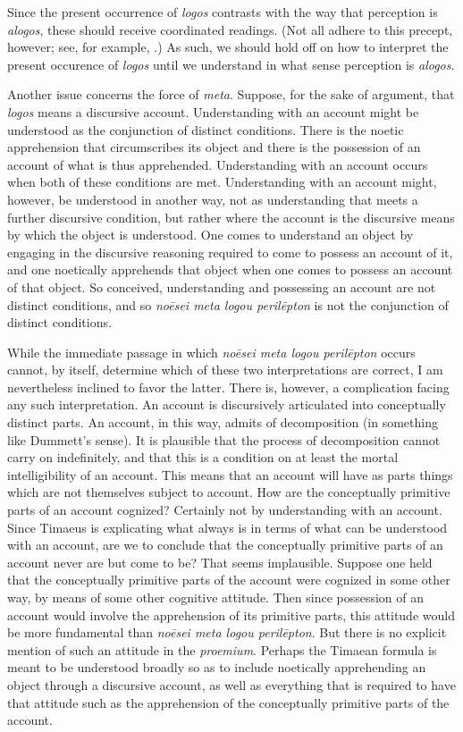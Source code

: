 Since the present occurrence of \emph{logos} contrasts with the way that perception is \emph{alogos}, these should receive coordinated readings. (Not all adhere to this precept, however; see, for example, \citealt[13]{Zeyl:2000cs}.) As such, we should hold off on how to interpret the present occurence of \emph{logos} until we understand in what sense perception is \emph{alogos}.

Another issue concerns the force of \emph{meta}. Suppose, for the sake of argument, that \emph{logos} means a discursive account. Understanding with an account might be understood as the conjunction of distinct conditions. There is the noetic apprehension that circumscribes its object and there is the possession of an account of what is thus apprehended. Understanding with an account occurs when both of these conditions are met. Understanding with an account might, however, be understood in another way, not as understanding that meets a further discursive condition, but rather where the account is the discursive means by which the object is understood. One comes to understand an object by engaging in the discursive reasoning required to come to possess an account of it, and one noetically apprehends that object when one comes to possess an account of that object. So conceived, understanding and possessing an account are not distinct conditions, and so \emph{noēsei meta logou perilēpton} is not the conjunction of distinct conditions. 

While the immediate passage in which \emph{noēsei meta logou perilēpton} occurs cannot, by itself, determine which of these two interpretations are correct, I am nevertheless inclined to favor the latter. There is, however, a complication facing any such interpretation. An account is discursively articulated into conceptually distinct parts. An account, in this way, admits of decomposition (in something like Dummett's \citeyear{dummett73} sense). It is plausible that the process of decomposition cannot carry on indefinitely, and that this is a condition on at least the mortal intelligibility of an account. This means that an account will have as parts things which are not themselves subject to account. How are the conceptually primitive parts of an account cognized? Certainly not by understanding with an account. Since Timaeus is explicating what always is in terms of what can be understood with an account, are we to conclude that the conceptually primitive parts of an account never are but come to be? That seems implausible. Suppose one held that the conceptually primitive parts of the account were cognized in some other way, by means of some other cognitive attitude. Then since possession of an account would involve the apprehension of its primitive parts, this attitude would be more fundamental than \emph{noēsei meta logou perilēpton}. But there is no explicit mention of such an attitude in the \emph{proemium}. Perhaps the Timaean formula is meant to be understood broadly so as to include noetically apprehending an object through a discursive account, as well as everything that is required to have that attitude such as the apprehension of the conceptually primitive parts of the account.

